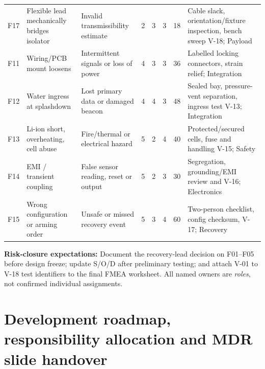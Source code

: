 \begin{longtable}{@{}L{9mm}L{30mm}L{32mm}c c c r L{37mm}@{}}
F17 & Flexible lead mechanically bridges isolator & Invalid transmissibility estimate & 2 & 3 & 3 & 18 & Cable slack, orientation/fixture inspection, bench sweep V-18; Payload\\
F11 & Wiring/PCB mount loosens & Intermittent signals or loss of power & 4 & 3 & 3 & 36 & Labelled locking connectors, strain relief; Integration\\
F12 & Water ingress at splashdown & Lost primary data or damaged beacon & 4 & 4 & 3 & 48 & Sealed bay, pressure-vent separation, ingress test V-13; Integration\\
F13 & Li-ion short, overheating, cell abuse & Fire/thermal or electrical hazard & 5 & 2 & 4 & 40 & Protected/secured cells, fuse and handling V-15; Safety\\
F14 & EMI / transient coupling & False sensor reading, reset or output & 5 & 2 & 3 & 30 & Segregation, grounding/EMI review and V-16; Electronics\\
F15 & Wrong configuration or arming order & Unsafe or missed recovery event & 5 & 3 & 4 & 60 & Two-person checklist, config checksum, V-17; Recovery\\
\end{longtable}
\endgroup %
\normalsize

\textbf{Risk-closure expectations:} Document the recovery-lead decision on F01--F05 before design freeze; update S/O/D after preliminary testing; and attach V-01 to V-18 test identifiers to the final FMEA worksheet. All named owners are \emph{roles}, not confirmed individual assignments.

\section{Development roadmap, responsibility allocation and MDR slide handover}
\label{sec:schedule}

